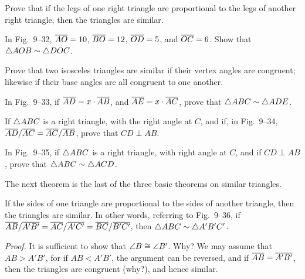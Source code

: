 \documentclass[11pt]{book}
\begin{document}
\begin{exercisecols}
\begin{exlist}
\item Prove that if the legs of one right triangle are proportional to the legs
      of another right triangle, then the triangles are similar.
\item In Fig.~9--32, $\overline{AO} = 10$, $\overline{BO} = 12$, $\overline{OD} = 5$, and
      $\overline{OC} = 6$. Show that $\triangle AOB \sim \triangle DOC$.
\exfig{\FIGIXTHIRTYTWO}
\item Prove that two isosceles triangles are similar if their vertex angles are
      congruent; likewise if their base angles are all congruent to one another.
\item In Fig.~9--33, if $\overline{AD} = x \cdot \overline{AB}$, and $\overline{AE} = x \cdot
      \overline{AC}$, prove that $\triangle ABC \sim \triangle ADE$.
\exfig{\FIGIXTHIRTYTHREE}
\item If $\triangle ABC$ is a right triangle, with the right angle at $C$, and if, in
      Fig.~9--34, $\overline{AD}/\overline{AC} = \overline{AC}/\overline{AB}$, prove that $CD \perp AB$.
\exfig{\FIGIXTHIRTYFOUR}
\item[\stex 6.] In Fig.~9--35, if $\triangle ABC$ is a right triangle, with right
      angle at $C$, and if $CD \perp AB$, prove that $\triangle ABC \sim
      \triangle ACD$.
\exfig{\FIGIXTHIRTYFIVE}
\end{exlist}
\end{exercisecols}

The next theorem is the last of the three basic theorems on similar triangles.

\begin{theorem}
If the sides of one triangle are proportional to the sides of another triangle,
then the triangles are similar. In other words, referring to Fig.~9--36, if
$\overline{AB}/\overline{A'B'} = \overline{AC}/\overline{A'C'} = \overline{BC}/\overline{B'C'}$, then
$\triangle ABC \sim \triangle A'B'C'$.
\end{theorem}

\noindent\emph{Proof.} It is sufficient to show that $\angle B \cong \angle B'$.
Why? We may assume that $AB > A'B'$, for if $AB < A'B'$, the argument can be
reversed, and if $\overline{AB} = \overline{A'B'}$, then the triangles are congruent (why?),
and hence similar.

\FIGIXTHIRTYSIX

\begin{steps}
\end{steps}
\end{document}
